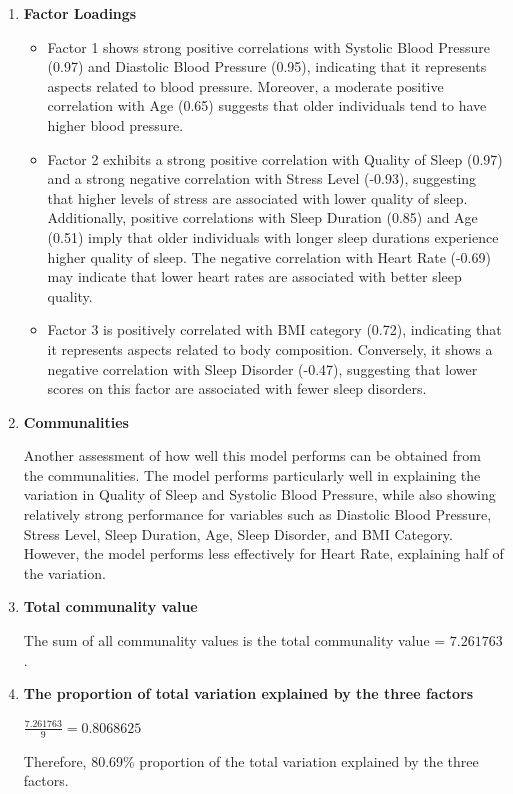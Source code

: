 \documentclass[11pt]{article}
\begin{document}
		\begin{enumerate}
			
			\item \textbf{Factor Loadings}
			\begin{itemize}
				\item Factor 1 shows strong positive correlations with Systolic Blood Pressure (0.97) and Diastolic Blood Pressure (0.95), indicating that it represents aspects related to blood pressure. Moreover, a moderate positive correlation with Age (0.65) suggests that older individuals tend to have higher blood pressure.
				
				\item Factor 2 exhibits a strong positive correlation with Quality of Sleep (0.97) and a strong negative correlation with Stress Level (-0.93), suggesting that higher levels of stress are associated with lower quality of sleep. Additionally, positive correlations with Sleep Duration (0.85) and Age (0.51) imply that older individuals with longer sleep durations experience higher quality of sleep. The negative correlation with Heart Rate (-0.69) may indicate that lower heart rates are associated with better sleep quality.
				
				\item Factor 3 is positively correlated with BMI category (0.72), indicating that it represents aspects related to body composition. Conversely, it shows a negative correlation with Sleep Disorder (-0.47), suggesting that lower scores on this factor are associated with fewer sleep disorders.
			\end{itemize}
			
			\item \textbf{Communalities}
			
			Another assessment of how well this model performs can be obtained from the communalities. The model performs particularly well in explaining the variation in Quality of Sleep and Systolic Blood Pressure, while also showing relatively strong performance for variables such as Diastolic Blood Pressure, Stress Level, Sleep Duration, Age, Sleep Disorder, and BMI Category. However, the model performs less effectively for Heart Rate, explaining half of the variation.
			
			\item \textbf{Total communality value}
			
			The sum of all communality values is the total communality value = $ 7.261763$. 
			
			\item \textbf{The proportion of total variation explained by the three factors} 
			\begin{center}
				$\frac{7.261763}{9} = 0.8068625$
			\end{center}
			Therefore, 80.69\% proportion of the total variation explained by the three factors.
			

\end{enumerate}
\end{document}
